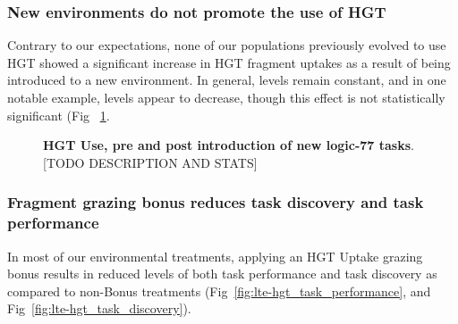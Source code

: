 \documentclass[PhD]{msu-thesis}
\begin{document}
\subsubsection{New environments do not promote the use of HGT}
Contrary to our expectations,
none of our populations previously evolved to use HGT showed a significant increase in HGT fragment uptakes as a result of being introduced to a new environment. In general, levels 
remain constant, and in one notable example, levels appear to decrease, though this effect is not statistically significant (Fig ~\ref{fig:lte-hgt_use}.

	\begin{figure}[!h]
	\caption{\textbf{HGT Use, pre and post introduction of new logic-77 tasks}. [TODO DESCRIPTION AND STATS]%
	}
	\label{fig:lte-hgt_use}
	\end{figure}

\subsubsection{Fragment grazing bonus reduces task discovery and task performance}
In most of our environmental treatments, applying an HGT Uptake grazing bonus
results in reduced levels of both task performance and task discovery as compared to non-Bonus treatments (Fig~\ref{fig:lte-hgt_task_performance}, and Fig~\ref{fig:lte-hgt_task_discovery}).
\end{document}
